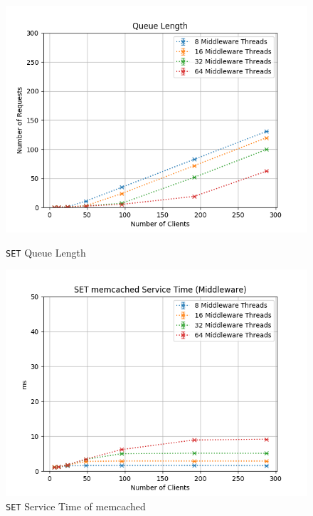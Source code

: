 \documentclass[11pt,a4paper]{article}
\begin{document}
\begin{figure}[H]
	\centering
    \begin{minipage}{0.5\textwidth}
        \includegraphics[width=\textwidth]{../illustrations/plots/3_1_full_system_write/1-0/middleware_queue_length.png}
        \caption{\texttt{SET} Queue Length}
        \label{fig:full_system_write_set_ql}
    \end{minipage}\hfill
    \begin{minipage}{0.5\textwidth}
        \centering
        \includegraphics[width=\textwidth]{../illustrations/plots/3_1_full_system_write/1-0/middleware_set_service_time_ms.png}
        \caption{\texttt{SET} Service Time of memcached}
        \label{fig:full_system_write_set_st_mw}
    \end{minipage}
\end{figure}
\end{document}

